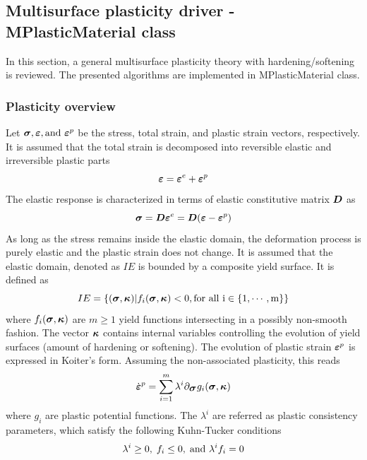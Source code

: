 \documentclass[epsf,a4paper]{article}
\newcommand{\mbf}[1]{\mbox{\boldmath$#1$}}
\newcommand{\ep}[0]{\mbf{\varepsilon}^p}
\newcommand{\epd}[0]{\dot{\mbf{\varepsilon}}^p}
\newcommand{\e}{\mbf{\varepsilon}}
\begin{document}
\subsection{Multisurface plasticity driver - MPlasticMaterial class}

In this section, a general multisurface plasticity theory with
hardening/softening is reviewed. The presented algorithms are
implemented in MPlasticMaterial class.

\subsubsection{Plasticity overview}
Let $\mbf{\sigma},\e, {\rm and}\  \ep$ be the stress, total strain, and plastic strain vectors, respectively.
It is assumed that the total strain is decomposed into reversible elastic and irreversible plastic parts
\begin{equation}
  \e = \e^e + \ep
\end{equation}
The elastic response is characterized in terms of elastic constitutive matrix $\mbf{D}$ as
\begin{equation}
\label{el1}
\mbf{\sigma}=\mbf{D}\e^e = \mbf{D}(\mbf{\varepsilon}-\ep)
\end{equation}
As long as the stress remains inside the elastic domain, the deformation process is purely elastic and the plastic strain does not change.
It is assumed that the elastic domain, denoted as $IE$ is bounded by a composite yield surface. It is defined as
\begin{equation}
IE=\{(\mbf{\sigma},\mbf{\kappa})|f_i(\mbf{\sigma},\mbf{\kappa})<0, \rm{for\ all\ }i\in\{1,\cdots,m\}\}
\end{equation}
where $f_i(\mbf{\sigma},\mbf{\kappa})$ are $m\ge1$ yield functions intersecting in a possibly non-smooth fashion. The 
vector $\mbf{\kappa}$ contains internal variables controlling the evolution of yield surfaces (amount of hardening or softening). 
The evolution of plastic strain $\ep$ is expressed in Koiter's form. Assuming the non-associated plasticity, this reads
\begin{equation}
\label{epe}
\epd=\sum^{m}_{i=1} \lambda^i \partial_{\mbf{\sigma}}g_i(\mbf{\sigma},\mbf{\kappa})
\end{equation}
where $g_i$ are plastic potential functions. The $\lambda^i$ are referred as plastic consistency parameters, which satisfy the following Kuhn-Tucker conditions
\begin{equation}
\label{ktc}
\lambda^i\ge0,\;f_i\le0,\;{\rm and}\ \lambda^i f_i=0
\end{equation}
\end{document}
